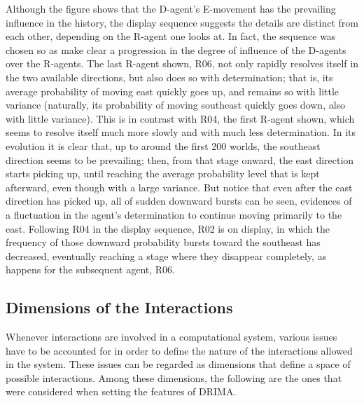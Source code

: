 \documentclass[11pt, a4paper]{article}
\begin{document}
Although the figure shows that the D-agent's E-movement has the prevailing influence in the history, the display sequence suggests the details are distinct from each other, depending on the R-agent one looks at. In fact, the sequence was chosen so as make clear a progression in the degree of influence of the D-agents over the R-agents. The last R-agent shown, R06, not only rapidly resolves itself in the two available directions, but also does so with determination; that is, its average probability of moving east quickly goes up, and remains so with little variance (naturally, its probability of moving southeast quickly goes down, also with little variance). This is in contrast with R04, the first R-agent shown, which seems to resolve itself much more slowly and with much less determination. In its evolution it is clear that, up to around the first 200 worlds, the southeast direction seems to be prevailing; then, from that stage onward, the east direction starts picking up, until reaching the average probability level that is kept afterward, even though with a large variance. But notice that even after the east direction has picked up, all of sudden downward bursts can be seen, evidences of a fluctuation in the agent's determination to continue moving primarily to the east. Following R04 in the display sequence, R02 is on display, in which the frequency of those downward probability bursts toward the southeast has decreased, eventually reaching a stage where they disappear completely, as happens for the subsequent agent, R06.

\subsection{Dimensions of the Interactions}

Whenever interactions are involved in a computational system, various issues have to be accounted for in order to define the nature of the interactions allowed in the system. These issues can be regarded as dimensions that define a space of possible interactions. Among these dimensions, the following are the ones that were considered when setting the features of DRIMA.
\end{document}
